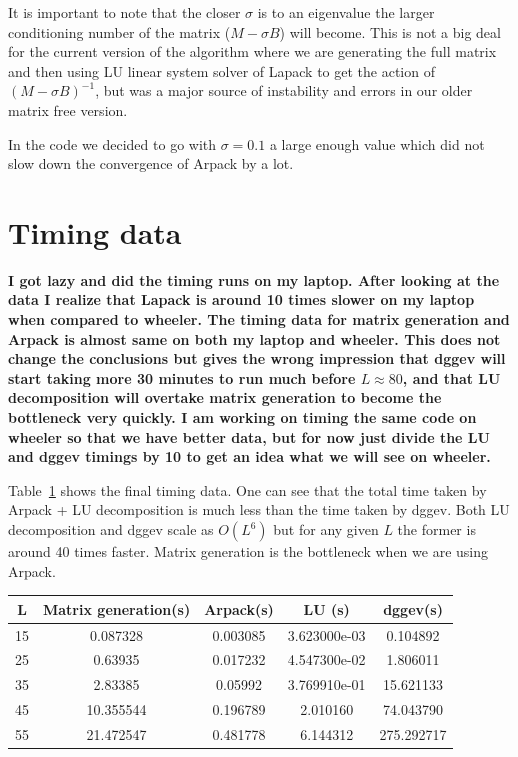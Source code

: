\documentclass[%
 reprint,
 amsmath,amssymb,
 aps,
]{revtex4-2}
\begin{document}
It is important to note that the closer $\sigma$ is to an eigenvalue the larger conditioning number of the matrix ($M - \sigma B$) will become. This is not a big deal for the current version of the algorithm where we are generating the full matrix and then using LU linear system solver of Lapack to get the action of $(M - \sigma B)^{-1}$, but was a major source of instability and errors in our older matrix free version.

In the code we decided to go with $\sigma = 0.1$ a large enough value which did not slow down the convergence of Arpack by a lot.


\section{\label{sec:Timing data} Timing data}

\textbf{I got lazy and did the timing runs on my laptop. After looking at the data I realize that Lapack is around 10 times slower on my laptop when compared to wheeler. The timing data for matrix generation and Arpack is almost same on both my laptop and wheeler. This does not change the conclusions but gives the wrong impression that dggev will start taking more 30 minutes  to run much before $L \approx 80$, and that LU decomposition will overtake matrix generation to become the bottleneck very quickly. I am working on timing the same code on wheeler so that we have better data, but for now just divide the LU and dggev timings by 10 to get an idea what we will see on wheeler.}

Table~\ref{table:timing_data} shows the final timing data. One can see that the total time taken by Arpack + LU decomposition is much less than the time taken by dggev. Both LU decomposition and dggev scale as $O(L^6)$ but for any given $L$ the former is around 40 times faster. Matrix generation is the bottleneck when we are using Arpack.

\begin{table}[h!]
  \centering
  \begin{tabular}{||c | c | c | c| c||}
    \hline
    L  & Matrix generation(s) & Arpack(s) & LU (s)       & dggev(s)  \\ [0.5ex]
    \hline\hline
    15 & 0.087328             & 0.003085  & 3.623000e-03 & 0.104892   \\
    25 & 0.63935              & 0.017232  & 4.547300e-02 & 1.806011   \\
    35 & 2.83385              & 0.05992   & 3.769910e-01 & 15.621133  \\
    45 & 10.355544            & 0.196789  & 2.010160     & 74.043790  \\
    55 & 21.472547            & 0.481778  & 6.144312     & 275.292717 \\ [1ex]
    \hline
  \end{tabular}
  \label{table:timing_data}
\end{table}
\end{document}
